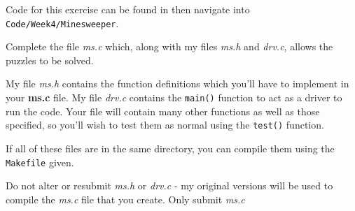 \begin{exercise}

Code for this exercise can be found in 
\noindent then navigate into \verb^Code/Week4/Minesweeper^.

Complete the file {\em ms.c} which, along with my files {\em
ms.h} and {\em drv.c}, allows the puzzles to be solved.

\noindent My file {\em ms.h} contains the function definitions
which you'll have to implement in your {\bf ms.c} file.  My file
{\em drv.c} contains the \verb^main()^ function to act as
a driver to run the code.  Your file will contain many other functions
as well as those specified, so you'll wish to test them as normal using
the \verb^test()^ function.

\noindent If all of these files are in the same directory, you can
compile them using the \verb^Makefile^ given.

\noindent Do not alter or resubmit {\em ms.h} or {\em
drv.c} - my original versions will be used to compile the
{\em ms.c} file that you create. Only submit {\em ms.c}

\end{exercise}
